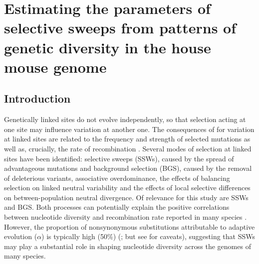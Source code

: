 

\chapter{Estimating the parameters of selective sweeps from patterns of genetic diversity in the house mouse genome}





%
%


\section{Introduction}

	Genetically linked sites do not evolve independently, so that selection acting at one site may influence variation at another one. The consequences of for variation at linked sites are related to the frequency and strength of selected mutations as well as, crucially, the rate of recombination \citep{RN124,RN287,RN206,RN157}. Several modes of selection at linked sites have been identified: selective sweeps (SSWs), caused by the spread of advantageous mutations and background selection (BGS), caused by the removal of deleterious variants, associative overdominance, the effects of balancing selection on linked neutral variability and the effects of local selective differences on between-population neutral divergence.	 Of relevance for this study are SSWs and BGS. Both processes can potentially explain the positive correlations between nucleotide diversity and recombination rate reported in many species \citep{RN117}. However, the proportion of nonsynonymous substitutions attributable to adaptive evolution ($\alpha$) is typically high (50\%) (\citealt{RN215}; but see \citealt{RN352} for caveats), suggesting that SSWs may play a substantial role in shaping nucleotide diversity across the genomes of many species.

